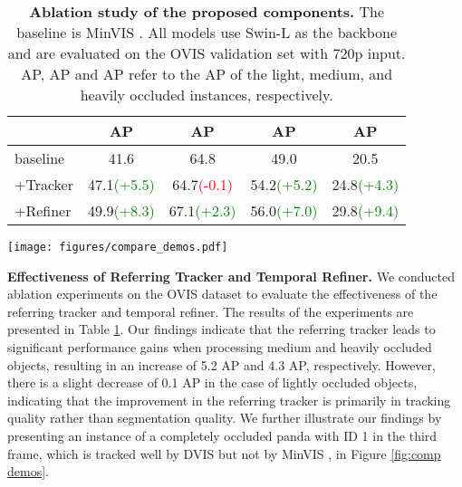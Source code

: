 \documentclass[10pt,twocolumn,letterpaper]{article}
\begin{document}
\begin{table}[t]
\setlength{\tabcolsep}{0.8mm}
\centering
\begin{tabular}{l|cccc}
	 & AP &  AP & AP & AP  \\
	\hline
	baseline & 41.6 & 64.8 & 49.0 & 20.5 \\
	+Tracker & 47.1\textcolor{green}{(+5.5)} & 64.7\textcolor{red}{(-0.1)} & 54.2\textcolor{green}{(+5.2)} & 24.8\textcolor{green}{(+4.3)} \\
	+Refiner & 49.9\textcolor{green}{(+8.3)} & 67.1\textcolor{green}{(+2.3)} & 56.0\textcolor{green}{(+7.0)} & 29.8\textcolor{green}{(+9.4)} \\
\hline
 \end{tabular}
\caption{\textbf{Ablation study of the proposed components.} The baseline is MinVIS \cite{minvis}. All models use Swin-L as the backbone and are evaluated on the OVIS validation set with 720p input. AP, AP and AP refer to the AP of the light, medium, and heavily occluded instances, respectively.}\vspace{-1mm}
 \label{tab:comp}
\end{table}
\begin{figure*}[t]
\begin{center}
\vspace{-5mm}\texttt{[image: figures/compare\_demos.pdf]}
\end{center}\vspace{-5mm}
\caption{\textbf{Visualization results comparing DVIS with current SOTA online and offline VIS methods.} VITA shows poor segmentation quality (highlighted with red circles) and tracking stability (highlighted with red rectangles). The referring tracker demonstrates strong tracking ability (highlighted with blue rectangles), while the temporal refiner effectively utilizes contextual information from previous and future frames (highlighted with green rectangles).}\vspace{-1mm}
\label{fig:comp demos}
\end{figure*}
\textbf{Effectiveness of Referring Tracker and Temporal Refiner.} We conducted ablation experiments on the OVIS dataset to evaluate the effectiveness of the referring tracker and temporal refiner. The results of the experiments are presented in Table \ref{tab:comp}. Our findings indicate that the referring tracker leads to significant performance gains when processing medium and heavily occluded objects, resulting in an increase of 5.2 AP and 4.3 AP, respectively. However, there is a slight decrease of 0.1 AP in the case of lightly occluded objects, indicating that the improvement in the referring tracker is primarily in tracking quality rather than segmentation quality. We further illustrate our findings by presenting an instance of a completely occluded panda with ID 1 in the third frame, which is tracked well by DVIS but not by MinVIS \cite{minvis}, in Figure \ref{fig:comp demos}.
\end{document}

